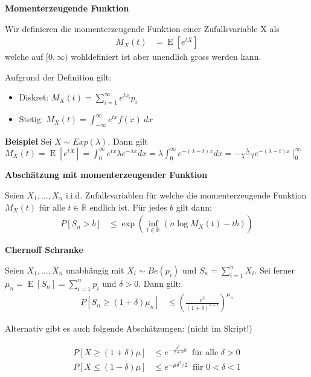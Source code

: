 \documentclass[25pt]{sciposter}
\newcommand{\R}{\mathbb{R}}
\newcommand{\E}{\operatorname{E}}
\newenvironment{method}[1]{\begin{mdframed}[backgroundcolor=blue!10,innertopmargin=15pt, innerbottommargin=15pt,nobreak=true]
		\textbf{#1 }
	}
	{ 
	\end{mdframed}
}
\begin{document}
\begin{multicols}{3}
\begin{method}{Momenterzeugende Funktion}
	Wir definieren die momenterzeugende Funktion einer Zufallsvariable X als
	\begin{align*}
		M_X(t) &= \E\left[e^{tX}\right]
	\end{align*}
	welche auf $[0,\infty)$ wohldefiniert ist aber unendlich gross werden kann.
	
 Aufgrund der Definition gilt:\begin{itemize}
 	\item Diskret: $M_X(t) = \sum_{i=1}^{\infty} e^{tx_i}p_i$
 	\item Stetig: $M_X(t)= \int_{-\infty}^{\infty} e^{tx}f(x)\ dx$
 \end{itemize}
\end{method}

\textbf{Beispiel}
Sei $X \sim Exp(\lambda)$. Dann gilt $M_X(t) = \E[e^{tX}] = \int_{0}^{\infty} e^{tx} \lambda e^{-\lambda x} dx = \lambda \int_{0}^{\infty}e^{-(\lambda-t)x} dx = - \frac{\lambda}{\lambda - t} e^{-(\lambda -t)x}\mid_0^\infty$
\begin{method}{Abschätzung mit momenterzeugender Funktion}
Seien $X_1,\ldots,X_n$ i.i.d. Zufallsvariablen für welche die momenterzeugende Funktion $M_X(t)$ für alle $t\in \R$ endlich ist. Für jedes $b$ gilt dann:
\begin{align*}
	P[S_n > b] &\leq \exp \left( \inf_{t\in\R} \left(  n\log M_X(t) - tb \right)  \right)
\end{align*}
\end{method}


\begin{method}{Chernoff Schranke}
	Seien $X_1,\ldots,X_n$ unabhängig mit $X_i \sim Be(p_i)$ und $S_n = \sum_{i=1}^{n}X_i$. Sei ferner $\mu_n = \E[S_n] = \sum_{i=1}^{n} p_i$ und $\delta > 0$. Dann gilt:
	\begin{align*}
		P[S_n \geq (1+\delta)\mu_n] &\leq \left(\frac{e^\delta}{(1+\delta)^{1+\delta}}\right)^{\mu_n}
	\end{align*}
\end{method}

Alternativ gibt es auch folgende Abschätzungen: (nicht im Skript!)

\begin{align*}
	P[X \geq (1+\delta)\mu] &\leq e^{-\frac{\delta^2}{2+\delta}\mu} \ \text{ für alle } \delta > 0  \\
	P[X \leq (1-\delta)\mu] &\leq e^{-\mu\delta^2/2} \ \text{ für } 0 < \delta < 1
\end{align*}



\end{multicols}
\end{document}
